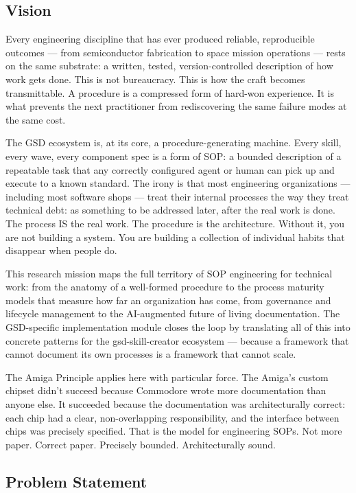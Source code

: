 \documentclass[11pt,letterpaper]{article}
\begin{document}
\subsection{Vision}

Every engineering discipline that has ever produced reliable, reproducible outcomes — from semiconductor fabrication to space mission operations — rests on the same substrate: a written, tested, version-controlled description of how work gets done. This is not bureaucracy. This is how the craft becomes transmittable. A procedure is a compressed form of hard-won experience. It is what prevents the next practitioner from rediscovering the same failure modes at the same cost.

The GSD ecosystem is, at its core, a procedure-generating machine. Every skill, every wave, every component spec is a form of SOP: a bounded description of a repeatable task that any correctly configured agent or human can pick up and execute to a known standard. The irony is that most engineering organizations --- including most software shops --- treat their internal processes the way they treat technical debt: as something to be addressed later, after the real work is done. The process IS the real work. The procedure is the architecture. Without it, you are not building a system. You are building a collection of individual habits that disappear when people do.

This research mission maps the full territory of SOP engineering for technical work: from the anatomy of a well-formed procedure to the process maturity models that measure how far an organization has come, from governance and lifecycle management to the AI-augmented future of living documentation. The GSD-specific implementation module closes the loop by translating all of this into concrete patterns for the gsd-skill-creator ecosystem --- because a framework that cannot document its own processes is a framework that cannot scale.

The Amiga Principle applies here with particular force. The Amiga's custom chipset didn't succeed because Commodore wrote more documentation than anyone else. It succeeded because the documentation was architecturally correct: each chip had a clear, non-overlapping responsibility, and the interface between chips was precisely specified. That is the model for engineering SOPs. Not more paper. Correct paper. Precisely bounded. Architecturally sound.

\subsection{Problem Statement}
\end{document}
